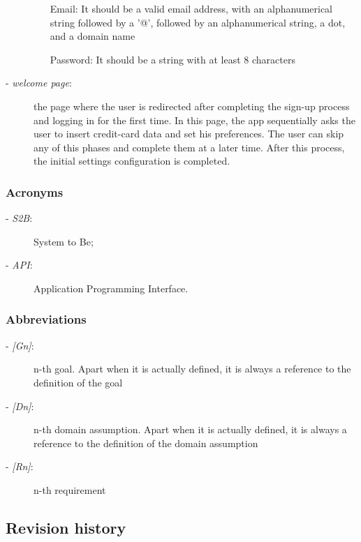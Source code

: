 \begin{description}
\begin{itemize}
				\item[Email:] It should be a valid email address, with an alphanumerical string followed by a '@', followed by an alphanumerical string, a dot, and a domain name
				\item[Password:] It should be a string with at least 8 characters
			\end{itemize}
			\item[- \textit{welcome page}:] the page where the user is redirected after completing the sign-up process and logging in for the first time. In this page, the app sequentially asks the user to insert credit-card data and set his preferences. The user can skip any of this phases and complete them at a later time. After this process, the initial settings configuration is completed.
		\end{description}
	\subsubsection{Acronyms}
		\begin{description}
		\item[- \textit{S2B}:] System to Be;
		\item[- \textit{API}:] Application Programming Interface.
	\end{description}
	\subsubsection{Abbreviations}
		\begin{description}
			\item[- \textit{[Gn]}:] n-th goal. Apart when it is actually defined, it is always a reference to the definition of the goal
			\item[- \textit{[Dn]}:] n-th domain assumption. Apart when it is actually defined, it is always a reference to the definition of the domain assumption
			\item[- \textit{[Rn]}:] n-th requirement
		\end{description}
\subsection{Revision history}
